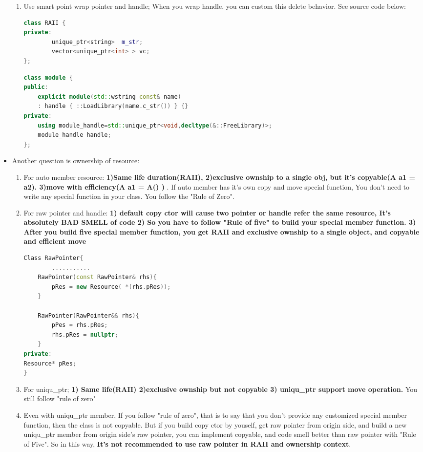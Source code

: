 \documentclass[a4paper,11pt,twoside]{book}
\begin{document}
\begin{itemize}
\begin{enumerate}
		\item Use smart point wrap pointer and handle; When you wrap handle, you can custom this delete behavior. See source code below:
\begin{lstlisting}[frame=single, language=c++]
class RAII {
private:
		unique_ptr<string>  m_str;
		vector<unique_ptr<int> > vc;
};
		\end{lstlisting}
		
\begin{lstlisting}[frame=single, language=c++]
class module {
public:
	explicit module(std::wstring const& name)
	: handle { ::LoadLibrary(name.c_str()) } {}
private:
	using module_handle=std::unique_ptr<void,decltype(&::FreeLibrary)>;
	module_handle handle;
};
\end{lstlisting}
	\end{enumerate}
	
	\item Another question is ownership of resource:
	\begin{enumerate}
		\item For auto member resource: \textbf{1)Same life duration(RAII), 2)exclusive ownship to a single obj, but it's copyable(A a1 = a2).  3)move with efficiency(A a1 = A() ) }. If auto member has it's own copy and move special function, You don't need to write any special function in your class. You follow the "Rule of Zero".
		
		\item For raw pointer and handle: \textbf{1) default copy ctor will cause two pointer or handle refer the same resource, It's absolutely BAD SMELL of code 2) So you have to follow "Rule of five" to build your special member function. 3) After you build five special member function, you get RAII and exclusive ownship to a single object, and copyable and efficient move}
\begin{lstlisting}[frame=single, language=c++]
Class RawPointer{
		...........
	RawPointer(const RawPointer& rhs){
		pRes = new Resource( *(rhs.pRes));
	}
		
	RawPointer(RawPointer&& rhs){
		pPes = rhs.pRes;
		rhs.pRes = nullptr;
	}
private:
Resource* pRes;
}
\end{lstlisting}
		
		\item For uniqu\_ptr; \textbf{1) Same life(RAII) 2)exclusive ownship but not copyable 3) uniqu\_ptr support move operation. } You still follow "rule of zero"

		\item Even with uniqu\_ptr member, If you follow "rule of zero", that is to say that you don't provide any customized special member function, then the class is not copyable. But if you build copy ctor by youself, get raw pointer from origin side, and build a new uniqu\_ptr member from origin side's raw pointer, you can implement copyable, and code smell better than raw pointer with "Rule of Five". So in this way, \textbf{It's not recommended to use raw pointer in RAII and ownership context}.
		

\end{enumerate}
\end{itemize}
\end{document}
